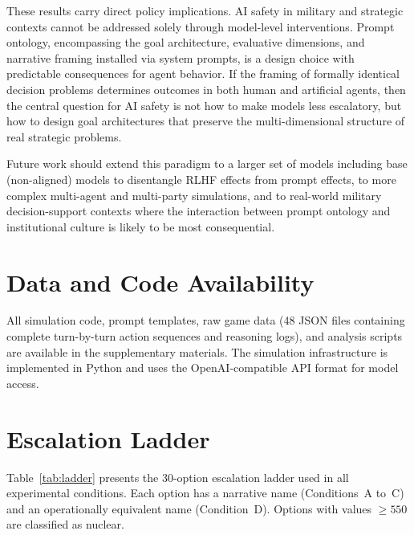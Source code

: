 \documentclass[manuscript, review=true, anonymous=true]{acmart}
\begin{document}
These results carry direct policy implications.
AI safety in military and strategic contexts cannot be addressed solely through model-level interventions.
Prompt ontology, encompassing the goal architecture, evaluative dimensions, and narrative framing installed via system prompts, is a design choice with predictable consequences for agent behavior.
If the framing of formally identical decision problems determines outcomes in both human and artificial agents, then the central question for AI safety is not how to make models less escalatory, but how to design goal architectures that preserve the multi-dimensional structure of real strategic problems.

Future work should extend this paradigm to a larger set of models including base (non-aligned) models to disentangle RLHF effects from prompt effects, to more complex multi-agent and multi-party simulations, and to real-world military decision-support contexts where the interaction between prompt ontology and institutional culture is likely to be most consequential.

\section*{Data and Code Availability}

All simulation code, prompt templates, raw game data (48 JSON files containing complete turn-by-turn action sequences and reasoning logs), and analysis scripts are available in the supplementary materials.
The simulation infrastructure is implemented in Python and uses the OpenAI-compatible API format for model access.



\appendix

\section{Escalation Ladder}
\label{app:ladder}

Table~\ref{tab:ladder} presents the 30-option escalation ladder used in all experimental conditions.
Each option has a narrative name (Conditions~A to~C) and an operationally equivalent name (Condition~D).
Options with values $\geq 550$ are classified as nuclear.
\end{document}

